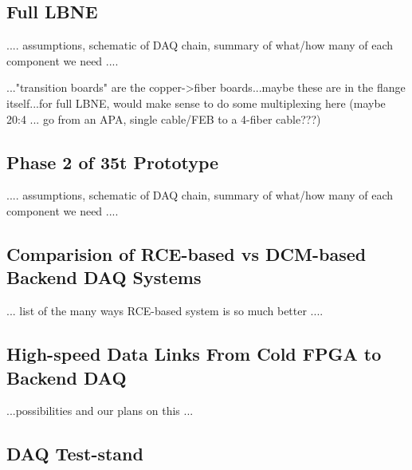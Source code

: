 \subsection{Full LBNE}

....  assumptions, schematic of DAQ chain, summary of what/how many of each component we need  ....  


..."transition boards" are the copper->fiber boards...maybe these are in the flange itself...for full LBNE, would make sense to do some multiplexing here (maybe 20:4 ... go from an APA, single cable/FEB to a 4-fiber cable???)


\subsection{Phase 2 of 35t Prototype}


....  assumptions, schematic of DAQ chain, summary of what/how many of each component we need  ....  


\subsection{Comparision of RCE-based vs DCM-based Backend DAQ Systems}

... list of the many ways RCE-based system is so much better  ....

\subsection{High-speed Data Links From Cold FPGA to Backend DAQ}

...possibilities and our plans on this ...


\subsection{DAQ Test-stand}


